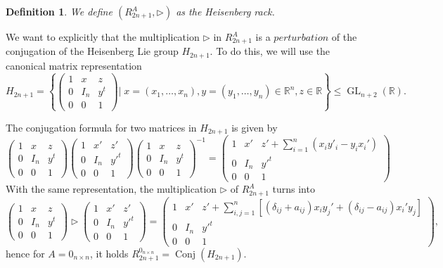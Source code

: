 \documentclass[english,4paper,10pt]{article}
\newtheorem{definition}[thm]{Definition}
\begin{document}
\begin{definition}
We define $(R_{2n+1}^{A},\rhd)$ as the \emph{Heisenberg rack}.
\end{definition}

We want to explicitly that the multiplication $\rhd$ in $R_{2n+1}^A$  is a $perturbation$ of the conjugation of the Heisenberg Lie group $H_{2n+1}$. To do this, we will use the canonical matrix representation 
$$
H_{2n+1}=\left\{
\begin{pmatrix}
	1 & x & z \\
	0 & I_{n} & y^t \\
	0 & 0 & 1
	\end{pmatrix} \Bigg\vert\;  x=(x_1,\ldots,x_n),y=(y_1,\ldots,y_n)\in\mathbb{R}^n, z\in\mathbb{R}
\right\}\leq \operatorname{GL}_{n+2}(\mathbb{R}).
$$

The conjugation formula for two matrices in $H_{2n+1}$ is given by
$$
\begin{pmatrix}
	1 & x & z \\
	0 & I_{n} & y^t \\
	0 & 0 & 1
\end{pmatrix}
\begin{pmatrix}
	1 & x' & z' \\
	0 & I_{n} & y'^t \\
	0 & 0 & 1
\end{pmatrix}
\begin{pmatrix}
	1 & x & z \\
	0 & I_{n} & y^t \\
	0 & 0 & 1
\end{pmatrix}^{-1}=
\begin{pmatrix}
	1 & x' & z'+\displaystyle\sum_{i=1}^{n}(x_iy'_i-y_ix_i')\\
	0 & I_{n} & y'^t \\
	0 & 0 & 1
\end{pmatrix}
$$
With the same representation, the multiplication $\rhd$ of $R_{2n+1}^A$ turns into 
$$
\begin{pmatrix}
	1 & x & z \\
	0 & I_{n} & y^t \\
	0 & 0 & 1
\end{pmatrix}\rhd
\begin{pmatrix}
	1 & x' & z' \\
	0 & I_{n} & y'^t \\
	0 & 0 & 1
\end{pmatrix}=
\begin{pmatrix}
	1 & x' & z'+\displaystyle\sum_{i,j=1}^{n}\left[\left(\delta_{ij}+a_{ij}\right)x_iy_j'+\left(\delta_{ij}-a_{ij}\right)x_i'y_j\right]\\
	0 & I_{n} & y'^t \\
	0 & 0 & 1
\end{pmatrix},
$$
hence for $A=0_{n\times n}$, it holds $R_{2n+1}^{0_{n\times n}}=\operatorname{Conj}(H_{2n+1})$.
\end{document}
